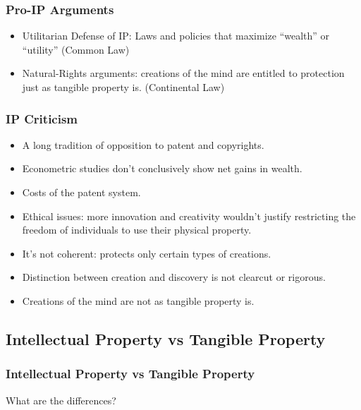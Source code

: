
\begin{frame}
\frametitle{Pro-IP Arguments}

\begin{itemize}
\item \alert{Utilitarian Defense of IP}: Laws and policies that maximize  ``wealth'' or ``utility'' (Common Law)
\item \alert{Natural-Rights arguments}: creations of the mind are entitled to protection just as tan­gible property is. (Continental Law)
\end{itemize}

\end{frame}


\begin{frame}
\frametitle{IP Criticism}

\begin{itemize}
\item A long tradition of opposition to patent and copyrights.
\item Econometric studies don't conclusively show net gains in wealth.
\item Costs of the patent system.
\item Ethical issues: more innovation and creativ­ity wouldn't justify restricting the free­dom of individuals to use their physical property.
\item It's not coherent: protects only certain types of creations.
\item Distinction between creation and discovery is not clear­cut or rigorous.
\item Creations of the mind are not as tan­gible property is.
\end{itemize}

\end{frame}


\subsection{Intellectual Property vs Tangible Property}
\begin{frame}
\frametitle{Intellectual Property vs Tangible Property}

\begin{center}
\Large
What are the differences?
\end{center}

\end{frame}


